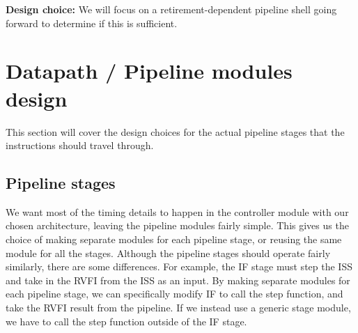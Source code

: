 \textbf{Design choice:} We will focus on a retirement-dependent pipeline shell going forward to determine if this is sufficient. 





\section{Datapath / Pipeline modules design}

This section will cover the design choices for the actual pipeline stages that the instructions should travel through. 

\subsection{Pipeline stages}

We want most of the timing details to happen in the controller module with our chosen architecture, leaving the pipeline modules fairly simple. This gives us the choice of making separate modules for each pipeline stage, or reusing the same module for all the stages. Although the pipeline stages should operate fairly similarly, there are some differences. For example, the IF stage must step the ISS and take in the RVFI from the ISS as an input. By making separate modules for each pipeline stage, we can specifically modify IF to call the step function, and take the RVFI result from the pipeline. If we instead use a generic stage module, we have to call the step function outside of the IF stage. 

